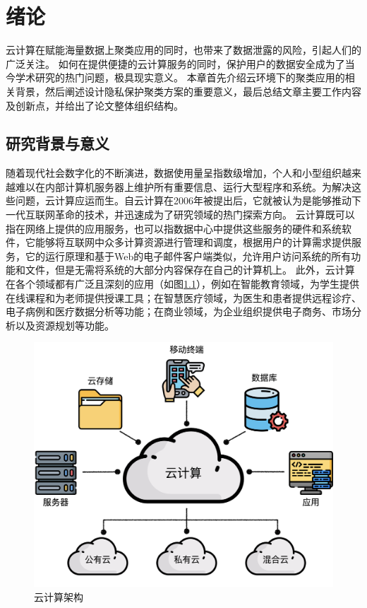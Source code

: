 \chapter{绪论}
云计算在赋能海量数据上聚类应用的同时，也带来了数据泄露的风险，引起人们的广泛关注。
如何在提供便捷的云计算服务的同时，保护用户的数据安全成为了当今学术研究的热门问题，极具现实意义。
本章首先介绍云环境下的聚类应用的相关背景，然后阐述设计隐私保护聚类方案的重要意义，最后总结文章主要工作内容及创新点，并给出了论文整体组织结构。

\section{研究背景与意义}
随着现代社会数字化的不断演进，数据使用量呈指数级增加，个人和小型组织越来越难以在内部计算机服务器上维护所有重要信息、运行大型程序和系统。为解决这些问题，云计算应运而生。自云计算在2006年被提出后，它就被认为是能够推动下一代互联网革命的技术，并迅速成为了研究领域的热门探索方向\cite{sadiku2014cloud}。
云计算既可以指在网络上提供的应用服务，也可以指数据中心中提供这些服务的硬件和系统软件，它能够将互联网中众多计算资源进行管理和调度，根据用户的计算需求提供服务，它的运行原理和基于Web的电子邮件客户端类似，允许用户访问系统的所有功能和文件，但是无需将系统的大部分内容保存在自己的计算机上。
此外，云计算在各个领域都有广泛且深刻的应用（如图\ref{img_cloud}），例如在智能教育领域，为学生提供在线课程和为老师提供授课工具；在智慧医疗领域，为医生和患者提供远程诊疗、电子病例和医疗数据分析等功能；在商业领域，为企业组织提供电子商务、市场分析以及资源规划等功能。

\begin{figure}[htbp]
	\centering
	\includegraphics[width=0.55\linewidth]{img/cloudarchi.png}
	\caption{云计算架构}
	\label{img_cloud}
\end{figure}

